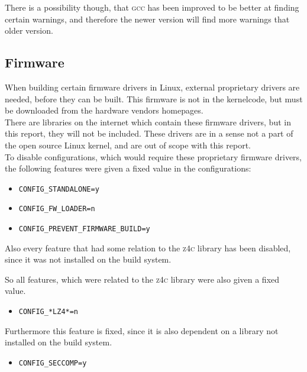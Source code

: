 \documentclass[a4paper,11pt]{report}
\newcommand{\textcode}[1]{
    \fboxsep=1pt
    \texttt{\colorbox{gray!20}{#1}}
}
\begin{document}
There is a possibility though, that \textsc{gcc} has been improved to be better 
at finding certain warnings, and therefore the newer version will find more 
warnings that older version.



            \subsection{Firmware}
When building certain firmware drivers in Linux, external proprietary drivers 
are needed, before they can be built. This firmware is not in the kernelcode, 
but must be downloaded from the hardware vendors homepages.
\\

There are libraries on the internet which contain these firmware drivers, but 
in this report, they will not be included. These drivers are in a sense not a 
part of the open source Linux kernel, and are out of scope with this report.
\\

To disable configurations, which would require these proprietary firmware 
drivers, the following features were given a fixed value in the configurations:

\begin{itemize}
    \item \textcode{CONFIG\_STANDALONE=y}
    \item \textcode{CONFIG\_FW\_LOADER=n}
    \item \textcode{CONFIG\_PREVENT\_FIRMWARE\_BUILD=y}
\end{itemize}


Also every feature that had some relation to the \textsc{z4c} library has been 
disabled, since it was not installed on the build system.

So all features, which were related to the \textsc{z4c} library were also given 
a fixed value.

\begin{itemize}
    \item \textcode{CONFIG\_*LZ4*=n}
\end{itemize}


Furthermore this feature is fixed, since it is also dependent on a library not 
installed on the build system.

\begin{itemize}
    \item \textcode{CONFIG\_SECCOMP=y}
\end{itemize}
\end{document}
